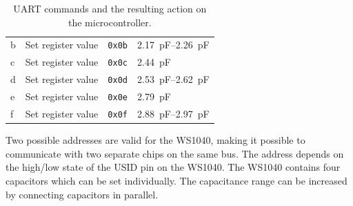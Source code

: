\begin{table}[htbp]
\begin{tabular}{|l|l|r|l|}
        b & Set register value & \texttt{0x0b} & \SIrange{2.17}{2.26}{pF}\\
        c & Set register value & \texttt{0x0c} & \SI{2.44}{pF}\\
        d & Set register value & \texttt{0x0d} & \SIrange{2.53}{2.62}{pF}\\
        e & Set register value & \texttt{0x0e} & \SI{2.79}{pF}\\
        f & Set register value & \texttt{0x0f} & \SIrange{2.88}{2.97}{pF}\\
        \hline
    \end{tabular}
    \caption{UART commands and the resulting action on the microcontroller.}
    \label{tab:rffe_commands}
\end{table}

Two possible addresses are valid for the WS1040, making it possible to communicate with two separate chips on the same bus. The address depends on the high/low state of the USID pin on the WS1040. The WS1040 contains four capacitors which can be set individually. The capacitance range can be increased by connecting capacitors in parallel.

